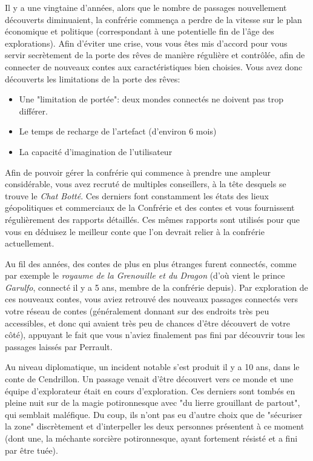 {	\vspace{0.4cm}
	\par Il y a une vingtaine d'années, alors que le nombre de passages nouvellement découverts diminuaient, la confrérie commença a perdre de la vitesse sur le plan économique et politique (correspondant à une potentielle fin de l'âge des explorations). Afin d'éviter une crise, vous vous êtes mis d'accord pour vous servir secrètement de la porte des rêves de manière régulière et contrôlée, afin de connecter de nouveaux contes aux caractéristiques bien choisies. Vous avez donc découverts les limitations de la porte des rêves:
	\begin{itemize}
		\item Une "limitation de portée": deux mondes connectés ne doivent pas trop différer.
		\item Le temps de recharge de l'artefact (d'environ 6 mois)
		\item La capacité d'imagination de l'utilisateur
	\end{itemize}
	
	\par Afin de pouvoir gérer la confrérie qui commence à prendre une ampleur considérable, vous avez recruté de multiples conseillers, à la tête desquels se trouve le \emph{Chat Botté}. Ces derniers font constamment les états des lieux géopolitiques et commerciaux de la Confrérie et des contes et vous fournissent régulièrement des rapports détaillés. Ces mêmes rapports sont utilisés pour que vous en déduisez le meilleur conte que l'on devrait relier à la confrérie actuellement.
	
	\par Au fil des années, des contes de plus en plus étranges furent connectés, comme par exemple le \emph{royaume de la Grenouille et du Dragon} (d'où vient le prince \emph{Garulfo}, connecté il y a 5 ans, membre de la confrérie depuis). Par exploration de ces nouveaux contes, vous aviez retrouvé des nouveaux passages connectés vers votre réseau de contes (généralement donnant sur des endroits très peu accessibles, et donc qui avaient très peu de chances d'être découvert de votre côté), appuyant le fait que vous n'aviez finalement pas fini par découvrir tous les passages laissés par Perrault.
	
	\vspace{0.4cm}
	\par Au niveau diplomatique, un incident notable s'est produit il y a 10 ans, dans le conte de Cendrillon. Un passage venait d'être découvert vers ce monde et une équipe d'explorateur était en cours d'exploration. Ces derniers sont tombés en pleine nuit sur de la magie potironnesque avec "du lierre grouillant de partout", qui semblait maléfique. Du coup, ils n'ont pas eu d'autre choix que de "sécuriser la zone" discrètement et d'interpeller les deux personnes présentent à ce moment (dont une, la méchante sorcière potironnesque, ayant fortement résisté et a fini par être tuée).
	
}
